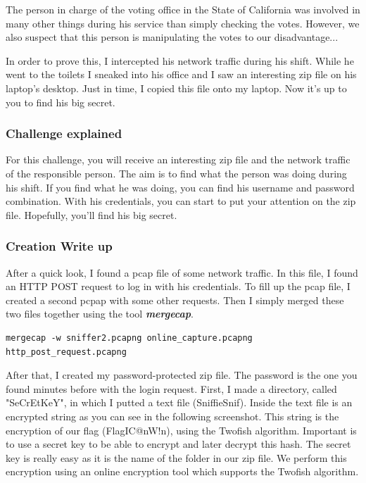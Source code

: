 \documentclass[../main.tex]{subfiles}
\begin{document}
The person in charge of the voting office in the State of California was involved in many other things during his service than simply checking the votes. However, we also suspect that this person is manipulating the votes to our disadvantage...

In order to prove this, I intercepted his network traffic during his shift. While he went to the toilets I sneaked into his office and I saw an interesting zip file on his laptop's desktop. Just in time, I copied this file onto my laptop. Now it's up to you to find his big secret.

\subsubsection{Challenge explained}

For this challenge, you will receive an interesting zip file and the network traffic of the responsible person. The aim is to find what the person was doing during his shift. If you find what he was doing, you can find his username and password combination. With his credentials, you can start to put your attention on the zip file. Hopefully, you'll find his big secret.

\subsubsection{Creation Write up}
After a quick look, I found a pcap file of some network traffic. In this file, I found an HTTP POST request to log in with his credentials. To fill up the pcap file, I created a second pcpap with some other requests. Then I simply merged these two files together using the tool \textit{\textbf{mergecap}}.

\begin{lstlisting}
mergecap -w sniffer2.pcapng online_capture.pcapng http_post_request.pcapng
\end{lstlisting}

After that, I created my password-protected zip file. The password is the one you found minutes before with the login request. First, I made a directory, called "SeCrEtKeY", in which I putted a text file (SniffieSnif). Inside the text file is an encrypted string as you can see in the following screenshot. This string is the encryption of our flag (Flag{IC@nW!n}), using the Twofish algorithm. Important is to use a secret key to be able to encrypt and later decrypt this hash. The secret key is really easy as it is the name of the folder in our zip file. We perform this encryption using an online encryption tool which supports the Twofish algorithm.
\end{document}

